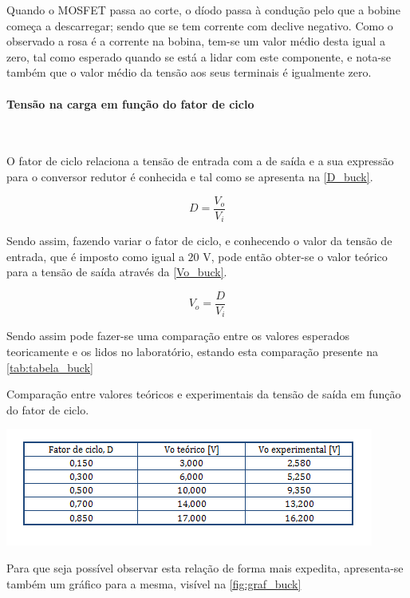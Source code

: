 \documentclass[a4paper,11pt]{article}
\numberwithin{equation}{section}
\begin{document}
Quando o MOSFET passa ao corte, o díodo passa à condução pelo que a bobine começa a descarregar; sendo que se tem corrente com declive negativo. Como o observado a rosa é a corrente na bobina, tem-se um valor médio desta igual a zero, tal como esperado quando se está a lidar com este componente, e nota-se também que o valor médio da tensão aos seus terminais é igualmente zero.

\paragraph{Tensão na carga em função do fator de ciclo}\mbox{}\

O fator de ciclo relaciona a tensão de entrada com a de saída e a sua expressão para o conversor redutor é conhecida e tal como se apresenta na \autoref{D_buck}.

\begin{equation}
	D= \frac{V_o}{V_i} \label{D_buck}
\end{equation}

Sendo assim, fazendo variar o fator de ciclo, e conhecendo o valor da tensão de entrada, que é imposto como igual a $20$ V, pode então obter-se o valor teórico para a tensão de saída através da \autoref{Vo_buck}.

\begin{equation}
V_o= \frac{D}{V_i} \label{Vo_buck}
\end{equation}

Sendo assim pode fazer-se uma comparação entre os valores esperados teoricamente e os lidos no laboratório, estando esta comparação presente na \autoref{tab:tabela_buck}

\begin{table}[!htb]
	\centering
	\caption{Comparação entre valores teóricos e experimentais da tensão de saída em função do fator de ciclo.}
	\includegraphics[width=0.8\linewidth]{teoricas/tabela_buck}
	\label{tab:tabela_buck}
\end{table}

Para que seja possível observar esta relação de forma mais expedita, apresenta-se também um gráfico para a mesma, visível na \autoref{fig:graf_buck}
\end{document}
